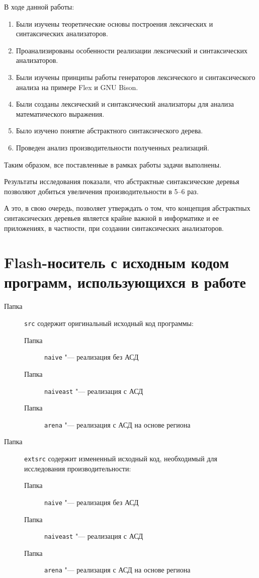 \documentclass[bachelor, och, coursework]{SCWorks}
\begin{document}
\conclusion

В ходе данной работы:

\begin{enumerate}
    \item Были изучены теоретические основы построения лексических и 
    синтаксических анализаторов.
    \item Проанализированы особенности реализации лексический и 
    синтаксических анализаторов.
    \item Были изучены принципы работы генераторов лексического и 
    синтаксического анализа на примере Flex и GNU Bison.
    \item Были созданы лексический и синтаксический анализаторы для анализа
    математического выражения.
    \item Было изучено понятие абстрактного синтаксического дерева.
    \item Проведен анализ производительности полученных реализаций.
\end{enumerate}

Таким образом, все поставленные в рамках работы задачи выполнены.

Результаты исследования показали, что абстрактные синтаксические 
деревья позволяют добиться увеличения производительности в 5–6 раз.

А это, в свою очередь, позволяет утверждать о том, что концепция 
абстрактных синтаксических деревьев является крайне важной в информатике и
ее приложениях, в частности, при создании синтаксических анализаторов.




\appendix

\section{Flash-носитель с исходным кодом программ, использующихся в работе}\label{pril-1}

\begin{description}
\item[Папка] \verb"src" содержит оригинальный исходный код программы:
\begin{description}
    \item[Папка] \verb"naive" "--- реализация без АСД
    \item[Папка] \verb"naiveast" "--- реализация с АСД
    \item[Папка] \verb"arena" "--- реализация с АСД на основе региона
\end{description}
\item[Папка] \verb"extsrc" содержит измененный исходный код, необходимый для исследования производительности:
\begin{description}
    \item[Папка] \verb"naive" "--- реализация без АСД
    \item[Папка] \verb"naiveast" "--- реализация с АСД
    \item[Папка] \verb"arena" "--- реализация с АСД на основе региона
\end{description}
\end{description}
\end{document}
